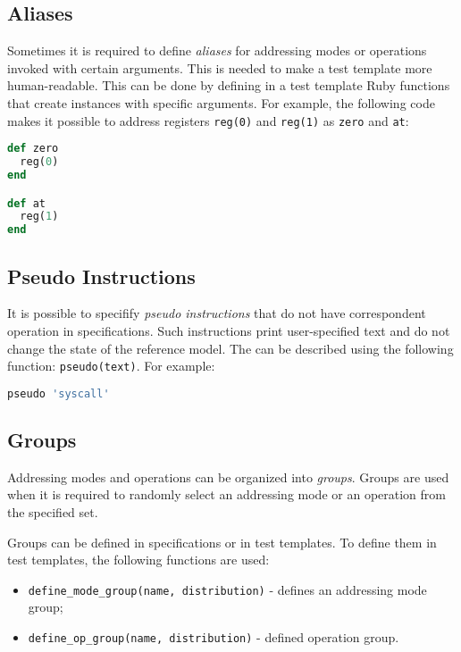 \documentclass[oneside,final,12pt]{extreport}
\begin{document}
\subsection{Aliases}

Sometimes it is required to define \emph{aliases} for addressing modes or operations
invoked with certain arguments. This is needed to make a test template more 
human-readable. This can be done by defining in a test template Ruby functions that
create instances with specific arguments. For example, the following code makes it
possible to address registers \texttt{reg(0)} and \texttt{reg(1)} as
\texttt{zero} and \texttt{at}:

\begin{lstlisting}[language=ruby]
def zero
  reg(0)
end

def at
  reg(1)
end
\end{lstlisting}

\subsection{Pseudo Instructions}

It is possible to specifify \emph{pseudo instructions} that do not have correspondent
operation in specifications. Such instructions print user-specified text and do not
change the state of the reference model. The can be described using the following
function: \texttt{pseudo(text)}. For example:

\begin{lstlisting}[language=ruby]
pseudo 'syscall'
\end{lstlisting}

\subsection{Groups}

Addressing modes and operations can be organized into \emph{groups}. Groups are
used when it is required to randomly select an addressing mode or an operation
from the specified set.

Groups can be defined in specifications or in test templates. To define them in
test templates, the following functions are used: 

\begin{itemize}
\item \texttt{define{\_}mode{\_}group(name, distribution)} - defines an addressing mode\\group;
\item \texttt{define{\_}op{\_}group(name, distribution)} - defined operation group.
\end{itemize}
\end{document}

